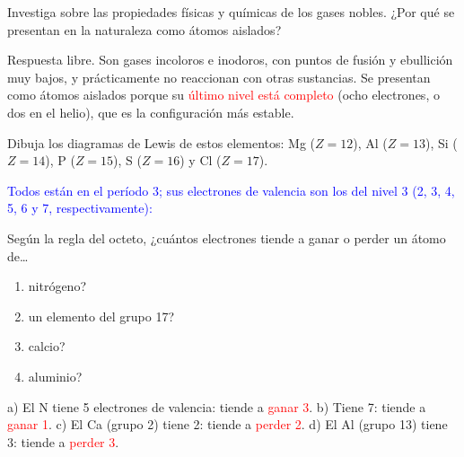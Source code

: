 \begin{exercise}
    Investiga sobre las propiedades físicas y químicas de los gases nobles. ¿Por qué se presentan en la naturaleza como átomos aislados?
    \begin{solu}
        Respuesta libre. Son gases incoloros e inodoros, con puntos de fusión y ebullición muy bajos, y prácticamente no reaccionan con otras sustancias. Se presentan como átomos aislados porque su \textcolor{red}{último nivel está completo} (ocho electrones, o dos en el helio), que es la configuración más estable.
    \end{solu}
\end{exercise}

\begin{exercise}
    Dibuja los diagramas de Lewis de estos elementos: Mg (\(Z = 12\)), Al (\(Z = 13\)), Si (\(Z = 14\)), P (\(Z = 15\)), S (\(Z = 16\)) y Cl (\(Z = 17\)).
    \begin{solu}
        \textcolor{blue}{Todos están en el período 3; sus electrones de valencia son los del nivel 3 (2, 3, 4, 5, 6 y 7, respectivamente):}
        \begin{center}
             \qquad
             \qquad
             \qquad
             \qquad
             \qquad
        \end{center}
    \end{solu}
\end{exercise}

\begin{exercise}
    Según la regla del octeto, ¿cuántos electrones tiende a ganar o perder un átomo de\ldots
    \begin{enumerate}[label=\alph*)]
        \item nitrógeno?
        \item un elemento del grupo 17?
        \item calcio?
        \item aluminio?
    \end{enumerate}
    \begin{solu}
        a) El N tiene 5 electrones de valencia: tiende a \textcolor{red}{ganar 3}. b) Tiene 7: tiende a \textcolor{red}{ganar 1}. c) El Ca (grupo 2) tiene 2: tiende a \textcolor{red}{perder 2}. d) El Al (grupo 13) tiene 3: tiende a \textcolor{red}{perder 3}.
    \end{solu}
\end{exercise}

